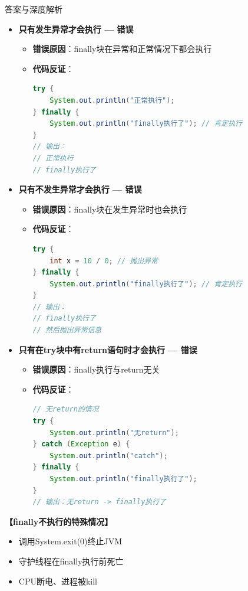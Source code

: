 \documentclass[12pt, a4paper]{ctexart}
\begin{document}
\begin{enumerate}[label=\textbf{\arabic*.}]
\begin{bluebox}{答案与深度解析}
\begin{itemize}[leftmargin=*, nosep, label={}]
			      \item[B] \textbf{只有发生异常才会执行 — 错误}
			            \begin{itemize}[label={}, leftmargin=*, nosep]
				            \item \textbf{错误原因}：finally块在异常和正常情况下都会执行
				            \item \textbf{代码反证}：
				                  \begin{lstlisting}[language=Java]
try {
    System.out.println("正常执行");
} finally {
    System.out.println("finally执行了"); // 肯定执行
}
// 输出：
// 正常执行
// finally执行了
				            \end{lstlisting}
			            \end{itemize}

			      \item[C] \textbf{只有不发生异常才会执行 — 错误}
			            \begin{itemize}[label={}, leftmargin=*, nosep]
				            \item \textbf{错误原因}：finally块在发生异常时也会执行
				            \item \textbf{代码反证}：
				                  \begin{lstlisting}[language=Java]
try {
    int x = 10 / 0; // 抛出异常
} finally {
    System.out.println("finally执行了"); // 肯定执行
}
// 输出：
// finally执行了
// 然后抛出异常信息
				            \end{lstlisting}
			            \end{itemize}

			      \item[D] \textbf{只有在try块中有return语句时才会执行 — 错误}
			            \begin{itemize}[label={}, leftmargin=*, nosep]
				            \item \textbf{错误原因}：finally执行与return无关
				            \item \textbf{代码反证}：
				                  \begin{lstlisting}[language=Java]
// 无return的情况
try {
    System.out.println("无return");
} catch (Exception e) {
    System.out.println("catch");
} finally {
    System.out.println("finally执行了");
}
// 输出：无return -> finally执行了
				            \end{lstlisting}
			            \end{itemize}
		      \end{itemize}

		      \textbf{【finally不执行的特殊情况】}
		      \begin{itemize}[label={}, nosep]
			      \item 调用System.exit(0)终止JVM
			      \item 守护线程在finally执行前死亡
			      \item CPU断电、进程被kill
		      \end{itemize}


\end{bluebox}
\end{enumerate}
\end{document}
